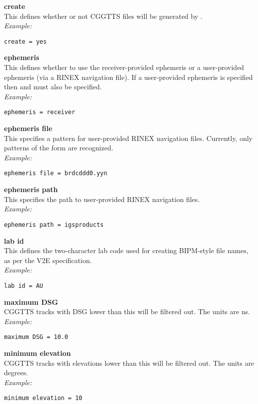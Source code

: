{\bfseries create}\\
This defines whether or not CGGTTS files will be generated by .\\
\textit{Example:}
\begin{lstlisting}
create = yes
\end{lstlisting}

{\bfseries ephemeris}\\
This defines whether to use the receiver-provided ephemeris or a user-provided ephemeris (via a RINEX navigation file).
If a user-provided ephemeris is specified then  and  
must also be specified.\\
\textit{Example:}
\begin{lstlisting}
ephemeris = receiver
\end{lstlisting}

{\bfseries ephemeris file}\\
This specifies a pattern for user-provided RINEX navigation files.
Currently, only patterns of the form  are recognized.\\
\textit{Example:}
\begin{lstlisting}
ephemeris file = brdcddd0.yyn
\end{lstlisting}

{\bfseries ephemeris path}\\
This specifies the path to user-provided RINEX navigation files.\\
\textit{Example:}
\begin{lstlisting}
ephemeris path = igsproducts
\end{lstlisting}

{\bfseries lab id}\\
This defines the two-character lab code used for creating BIPM-style file names, as per the V2E specification.\\
\textit{Example:}
\begin{lstlisting}
lab id = AU
\end{lstlisting}

{\bfseries maximum DSG}\\
CGGTTS tracks with DSG lower than this will be filtered out. 
The units are ns.\\
\textit{Example:}
\begin{lstlisting}
maximum DSG = 10.0
\end{lstlisting}

{\bfseries minimum elevation}\\
CGGTTS tracks with elevations lower than this will be filtered out. 
The units are degrees.\\
\textit{Example:}
\begin{lstlisting}
minimum elevation = 10
\end{lstlisting}

